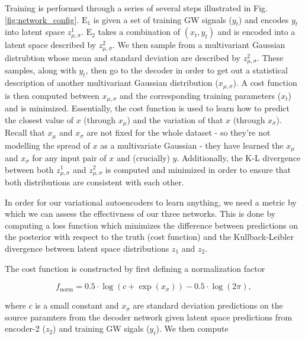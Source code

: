 \documentclass[%
showpacs,
 amsmath,amssymb,
 aps,
 twocolumn,
 prl,
 reprint,
floatfix,
]{revtex4-1}
\begin{document}
%
%
Training is performed through a series of several steps illustrated in Fig. \ref{fig:network_config}. 
$\textrm{E}_1$ is given a set of training \ac{GW} signals ($y_t$) and encodes $y_t$ into 
latent space $z^{1}_{\mu,\sigma}$. $\textrm{E}_2$ takes a combination of $(x_{t},y_{t})$ 
and is encoded into a latent space described by $z^{2}_{\mu,\sigma}$. 
We then sample from a multivariant Gaussian distrubtion whose mean and standard 
deviation are described by $z^{2}_{\mu,\sigma}$. These samples, along with $y_t$, then go 
to the decoder in order to get out a statistical description of another 
multivariant Gaussian distribution ($x_{\mu,\sigma}$). A cost function is then 
computed between $x_{\mu,\sigma}$ and the corresponding training parameters ($x_t$) and is minimized. 
Essentially, the cost function is used to learn how to predict the
closest value of $x$ (through $x_{\mu}$) and the variation of that $x$ (through
$x_{\sigma}$). Recall that $x_{\mu}$ and $x_{\sigma}$ are not fixed for the
whole dataset - so they're not modelling the spread of $x$ as a multivariate
Gaussian - they have learned the $x_{\mu}$ and $x_{\sigma}$ for any input pair
of $x$ and (crucially) $y$.
Additionally, the K-L divergence between both $z^{1}_{\mu,\sigma}$ and $z^{2}_{\mu,\sigma}$ is 
computed and minimized in order to ensure that both distributions are consistent with each other.

%
%
In order for our variational autoencoders to learn anything, we need a metric by which 
we can assess the effectivness of our three networks. This is done by computing 
a loss function which minimizes the difference 
between predictions on the posterior with respect to the truth (cost function) and the Kullback-Leibler divergence 
between latent space distributions $z_1$ and $z_2$. 

%
%
The cost function is constructed by first defining a normalization factor

\begin{equation}
    f_{\textrm{norm}} = 0.5 \cdot \log(c + \exp(x_{\sigma})) - 0.5 \cdot \log(2\pi),
\end{equation}

where $c$ is a small constant and $x_{\sigma}$ are standard deviation predictions 
on the source paramters from the decoder network given latent space predictions 
from encoder-2 ($z_2$) and training GW sigals ($y_{t}$). We then 
compute 
\end{document}
